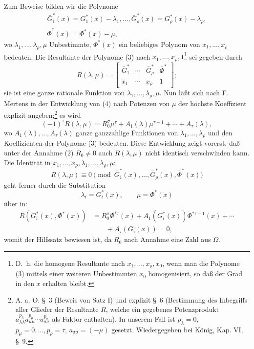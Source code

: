 Zum Beweise bilden wir die Polynome
\begin{equation}
\begin{gathered}
  \bar G_1^*(x)=G_1^*(x)-\lambda_1,
  \ldots,
  \bar G_\rho^*(x)=G_\rho^*(x)-\lambda_\rho,\\
  \bar\Phi^*(x)=\Phi^*(x)-\mu,
\end{gathered}
\tag{3}
\end{equation}
wo $\lambda_1,
\ldots,\lambda_\rho,\mu$ Unbestimmte, $\Phi^*(x)$ ein beliebiges Polynom von $x_1,
\ldots,x_\rho$ bedeuten. Die Resultante der Polynome (3) nach $x_1,
\ldots,x_\rho,1$\footnote{D.~h. die homogene Resultante nach $x_1,
\ldots,x_\rho,x_0$, wenn man die Polynome (3) mittels einer weiteren Unbestimmten $x_0$ homogenisiert, so daß der Grad in den $x$ erhalten bleibt.} sei gegeben durch
\begin{equation}
  R(\lambda,\mu)=\left[
  \begin{array}{cccc}
   \bar G_1^*&\cdots&\bar G_\rho^*&\bar\Phi^*\\
   x_1&\cdots&x_\rho&1
  \end{array}
  \right];
\tag{4}
\end{equation}
sie ist eine ganze rationale Funktion von $\lambda_1,
\ldots,\lambda_\rho,\mu$. Nun läßt sich nach F. Mertens in der Entwicklung von (4) nach Potenzen von $\mu$ der höchste Koeffizient explizit angeben;\footnote{A. a. O. \S\ 3 (Beweis von Satz I) und explizit \S\ 6 (Bestimmung des Inbegriffs aller Glieder der Resultante $R$, welche ein gegebenes Potenzprodukt $a_{\lambda\lambda}^{p_\lambda} a_{\mu\mu}^{p_\mu}\cdots a_{\sigma\sigma}^{p_\sigma}$ als Faktor enthalten). In unserem Fall ist $p_\lambda=0$, $p_\mu=0,\ldots,p_\rho=\tau$, $a_{\sigma\sigma}=(-\mu)$ gesetzt. Wiedergegeben bei König, Kap. VI, \S\ 9.} es wird
\begin{equation}
  (-1)^\tau R(\lambda,\mu)
  =R_0^\sigma\mu^\tau+A_1(\lambda)\mu^{\tau-1}+\cdots+A_\tau(\lambda),
\tag{5}
\end{equation}
wo $A_1(\lambda),\ldots,A_\tau(\lambda)$ ganze ganzzahlige Funktionen von $\lambda_1,
\ldots,\lambda_\rho$ und den Koeffizienten der Polynome (3) bedeuten. Diese Entwicklung zeigt vorerst, daß unter der Annahme (2) $R_0\ne0$ auch $R(\lambda,
\mu)$ nicht identisch verschwinden kann. Die Identität in $x_1,
\ldots,x_\rho,
\lambda_1,
\ldots,
\lambda_\rho,
\mu$:
\[
  R(\lambda,
\mu)\equiv 0\pmod{\bar G_1^*(x),\ldots,
\bar G_\rho^*(x),\bar\Phi^*(x)}
\]
geht ferner durch die Substitution
\[
  \lambda_i=G_i^*(x),\qquad \mu=\Phi^*(x)
\]
über in:
\begin{equation}
\begin{aligned}
  R(G_i^*(x),\Phi^*(x))
  &=R_0^\sigma\Phi^{*\tau}(x)
    +A_1(G_i^*(x))\Phi^{*\tau-1}(x)+\cdots \\
  &\qquad +A_\tau(G_i(x))=0,
\end{aligned}
\tag{6}
\end{equation}
womit der Hilfssatz bewiesen ist, da $R_0$ nach Annahme eine Zahl aus $\Omega$.

